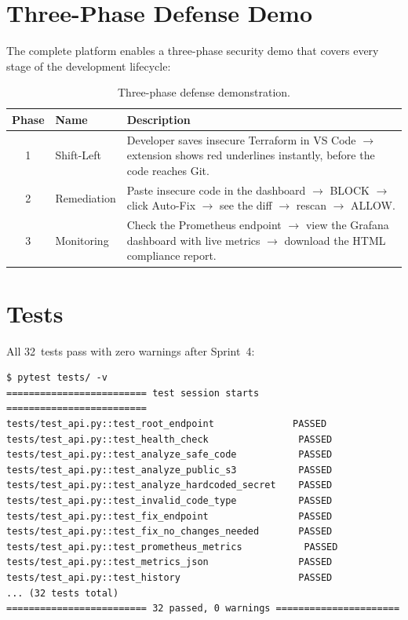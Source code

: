

\section{Three-Phase Defense Demo}

The complete platform enables a three-phase security demo that covers every stage of the development lifecycle:

\begin{table}[H]
\centering
\begin{tabularx}{\textwidth}{|c|l|X|}
\hline
\textbf{Phase} & \textbf{Name} & \textbf{Description} \\
\hline
1 & Shift-Left & Developer saves insecure Terraform in VS Code $\rightarrow$ extension shows red underlines instantly, before the code reaches Git. \\
\hline
2 & Remediation & Paste insecure code in the dashboard $\rightarrow$ BLOCK $\rightarrow$ click Auto-Fix $\rightarrow$ see the diff $\rightarrow$ rescan $\rightarrow$ ALLOW. \\
\hline
3 & Monitoring & Check the Prometheus endpoint $\rightarrow$ view the Grafana dashboard with live metrics $\rightarrow$ download the HTML compliance report. \\
\hline
\end{tabularx}
\caption{Three-phase defense demonstration.}
\label{tab:demo-phases}
\end{table}


\section{Tests}

All 32~tests pass with zero warnings after Sprint~4:

\begin{lstlisting}[language={}, caption={Final test suite results.}, label={lst:final-tests}]
$ pytest tests/ -v
========================= test session starts =========================
tests/test_api.py::test_root_endpoint              PASSED
tests/test_api.py::test_health_check                PASSED
tests/test_api.py::test_analyze_safe_code           PASSED
tests/test_api.py::test_analyze_public_s3           PASSED
tests/test_api.py::test_analyze_hardcoded_secret    PASSED
tests/test_api.py::test_invalid_code_type           PASSED
tests/test_api.py::test_fix_endpoint                PASSED
tests/test_api.py::test_fix_no_changes_needed       PASSED
tests/test_api.py::test_prometheus_metrics           PASSED
tests/test_api.py::test_metrics_json                PASSED
tests/test_api.py::test_history                     PASSED
... (32 tests total)
========================= 32 passed, 0 warnings ======================
\end{lstlisting}


